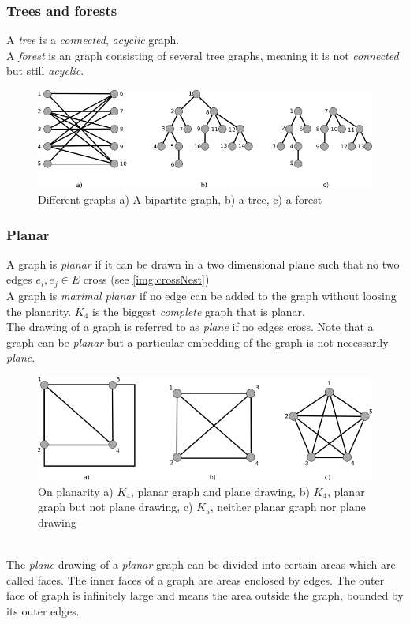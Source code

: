 \subsubsection{Trees and forests}
A \textit{tree} is a \textit{connected}, \textit{acyclic} graph.\\
A \textit{forest} is an graph consisting of several tree graphs, meaning it is not \textit{connected} but still \textit{acyclic}.
\begin{figure}[h!]
\begin{center}
\includegraphics[width= \textwidth]{figures/BipartiteTreeForest.png}
\caption{Different graphs a) A bipartite graph, b) a tree, c) a forest}
\label{BTF}
\end{center}
\end{figure}

\subsubsection{Planar}
A graph is \textit{planar} if it can be drawn in a two dimensional plane such that no two edges $e_i, e_j \in E$ cross (see \autoref{img:crossNest}) \\
A graph is \textit{maximal planar} if no edge can be added to the graph without loosing the planarity. $K_4$ is the biggest \textit{complete} graph that is planar.\\
The drawing of a graph is referred to as \textit{plane} if no edges cross. Note that a graph can be \textit{planar} but a particular embedding of the graph is not necessarily \textit{plane}.
\begin{figure}[h!]
\includegraphics[width =\textwidth]{figures/PlanarPlaneGraphs.png}
\caption{On planarity a) $K_4$, planar graph and plane drawing, b) $K_4$, planar graph but not plane drawing, c) $K_5$, neither planar graph nor plane drawing}
\label{PPG}
\end{figure}\\
The \textit{plane} drawing of a \textit{planar} graph can be divided into certain areas which are called faces. The inner faces of a graph are areas enclosed by edges. The outer face of graph is infinitely large and means the area outside the graph, bounded by its outer edges.
\newpage
